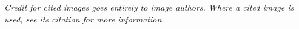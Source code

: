 \begin{remark}
    \textit{
        Credit for cited images goes entirely to image authors.
        Where a cited image is used, see its citation for more information.
    }
\end{remark}